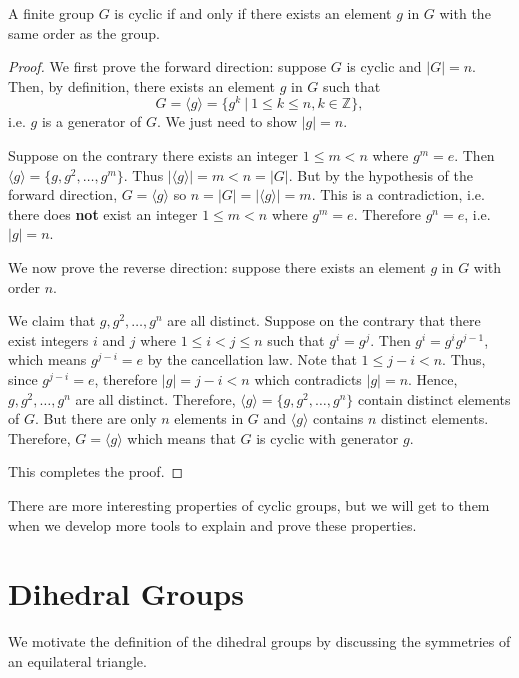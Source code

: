 \begin{theorem}\label{thrm-cyclic-group-has-element-with-same-order}
    A finite group $G$ is cyclic if and only if there exists an element $g$ in $G$ with the same order as the group.
\end{theorem}
\begin{proof}
    We first prove the forward direction: suppose $G$ is cyclic and $|G| = n$. Then, by definition, there exists an element $g$ in $G$ such that
    \[
        G = \langle g \rangle = \{g^k \ | \ 1 \leq k \leq n, k \in \mathbb{Z}\},
    \]
    i.e. $g$ is a generator of $G$. We just need to show $|g| = n$.

    Suppose on the contrary there exists an integer $1 \leq m < n$ where $g^m = e$. Then $\langle g \rangle = \{g, g^2, \dots, g^m\}$. Thus $|\langle g \rangle| = m < n = |G|$. But by the hypothesis of the forward direction, $G = \langle g \rangle$ so $n = |G| = |\langle g \rangle| = m$. This is a contradiction, i.e. there does \textbf{not} exist an integer $1 \leq m < n$ where $g^m = e$. Therefore $g^n = e$, i.e. $|g| = n$.

    We now prove the reverse direction: suppose there exists an element $g$ in $G$ with order $n$.
    
    We claim that $g, g^2, \dots, g^n$ are all distinct. Suppose on the contrary that there exist integers $i$ and $j$ where $1 \leq i < j \leq n$ such that $g^i = g^j$. Then $g^i = g^ig^{j-1}$, which means $g^{j-i} = e$ by the cancellation law. Note that $1 \leq j - i < n$. Thus, since $g^{j-i} = e$, therefore $|g| = j - i < n$ which contradicts $|g| = n$. Hence, $g, g^2, \dots, g^n$ are all distinct. Therefore, $\langle g \rangle = \{g, g^2, \dots, g^n\}$ contain distinct elements of $G$. But there are only $n$ elements in $G$ and $\langle g \rangle$ contains $n$ distinct elements. Therefore, $G = \langle g \rangle$ which means that $G$ is cyclic with generator $g$.

    This completes the proof.
\end{proof}

There are more interesting properties of cyclic groups, but we will get to them when we develop more tools to explain and prove these properties.

\newpage

\section{Dihedral Groups}
We motivate the definition of the dihedral groups by discussing the symmetries of an equilateral triangle.

